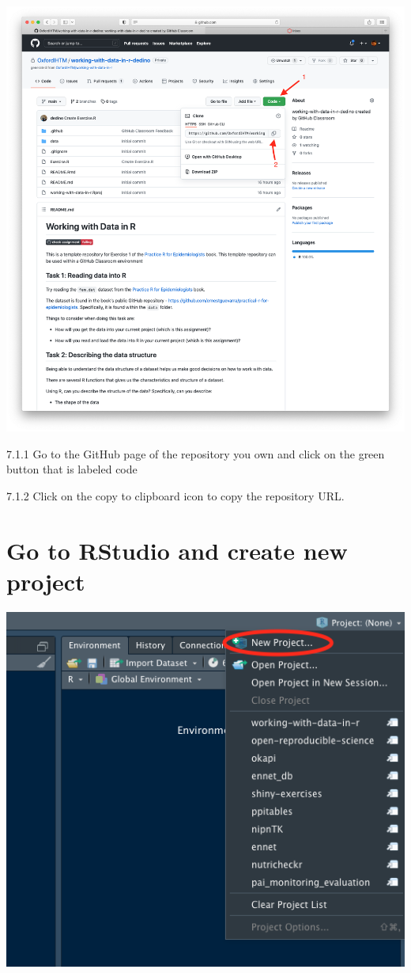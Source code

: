 \documentclass[
  12pt,
]{book}
\begin{document}
\includegraphics{images/clone_step1.png}

7.1.1 Go to the GitHub page of the repository you own and click on the green button that is labeled code

7.1.2 Click on the copy to clipboard icon to copy the repository URL.

\hypertarget{go-to-rstudio-and-create-new-project}{%
\section{Go to RStudio and create new project}\label{go-to-rstudio-and-create-new-project}}

\includegraphics{images/clone_step2.png}
\end{document}
